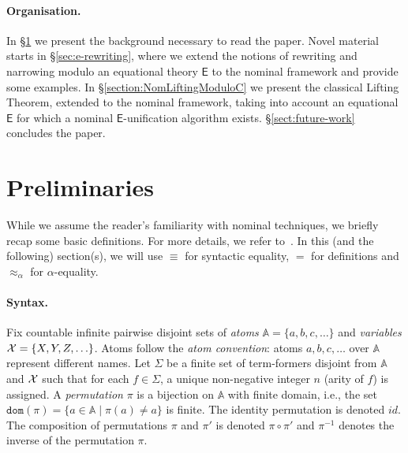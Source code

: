 \documentclass[11pt,a4paper]{amsart}
\newcommand{\atomSet}{\mathbb{A}}
\newcommand{\dom}[1]{\mathtt{dom}(#1)}
\newcommand{\theory}[1]{\ensuremath{\mathsf{#1}}}
\theoremstyle{plain}
\theoremstyle{definition}
\theoremstyle{remark}
\begin{document}
\paragraph*{Organisation.}  In \S\ref{sec:preliminaries} we present the background necessary to read the paper. Novel material starts in  \S\ref{sec:e-rewriting}, where we extend the notions of rewriting and narrowing modulo an equational theory \theory{E} to the nominal framework and provide some examples. In \S\ref{section:NomLiftingModuloC} we present the classical Lifting Theorem, extended to the nominal framework, taking into account an equational \theory{E} for which a nominal $\theory{E}$-unification algorithm exists. \S\ref{sect:future-work} concludes the paper.


\section{Preliminaries}\label{sec:preliminaries}

 While we assume the reader's familiarity with nominal techniques, we briefly recap some basic definitions. For more details, we refer to~\cite{NominalRewriting/FernandezG07}. In this (and the following) section(s), we will use $\equiv$ for syntactic equality, $=$ for definitions and $\approx_\alpha$ for $\alpha$-equality.

\paragraph{Syntax.}
Fix countable infinite pairwise disjoint sets of {\em atoms} \(\mathbb{A} = \{a,b,c,\ldots \}\) and {\em variables} \({\cal X} = \{X, Y, Z, \ldots \}\).
Atoms follow the \textit{atom convention}: atoms \(a, b, c,\ldots \)  over \(\atomSet\) represent different names.
Let \(\Sigma\) be a finite set of term-formers disjoint from \(\mathbb{A}\) and \({\cal X}\) such that for each \(f \in \Sigma\), a unique non-negative integer \(n\) (arity of \(f\)) is assigned.
A \textit{permutation} \(\pi\) is a bijection on \(\atomSet\) with finite domain, i.e., the set \(\dom{\pi} = \{a \in \atomSet \mid \pi(a) \neq a \}\) is finite. The identity permutation is denoted $id$. The composition of permutations $\pi$ and $\pi'$ is denoted $\pi\circ \pi'$ and $\pi^{-1}$ denotes the inverse of the permutation $\pi$.   
\end{document}
